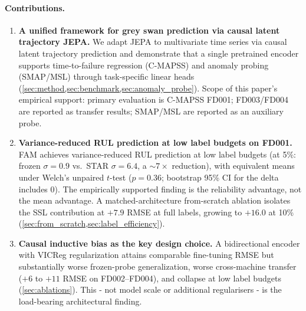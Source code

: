 \documentclass{article}
\begin{document}
\paragraph{Contributions.}
\begin{enumerate}[nosep]
  \item \textbf{A unified framework for grey swan prediction via causal latent trajectory JEPA.} We adapt JEPA to multivariate time series via causal latent trajectory prediction and demonstrate that a single pretrained encoder supports time-to-failure regression (C-MAPSS) and anomaly probing (SMAP/MSL) through task-specific linear heads (\cref{sec:method,sec:benchmark,sec:anomaly_probe}). Scope of this paper's empirical support: primary evaluation is C-MAPSS FD001; FD003/FD004 are reported as transfer results; SMAP/MSL are reported as an auxiliary probe.

  \item \textbf{Variance-reduced RUL prediction at low label budgets on FD001.} FAM achieves variance-reduced RUL prediction at low label budgets (at 5\%: frozen $\sigma = 0.9$ vs.\ STAR $\sigma = 6.4$, a $\sim 7\times$ reduction), with equivalent means under Welch's unpaired $t$-test ($p = 0.36$; bootstrap 95\% CI for the delta includes $0$). The empirically supported finding is the reliability advantage, not the mean advantage. A matched-architecture from-scratch ablation isolates the SSL contribution at $+7.9$ RMSE at full labels, growing to $+16.0$ at 10\% (\cref{sec:from_scratch,sec:label_efficiency}).

  \item \textbf{Causal inductive bias as the key design choice.} A bidirectional encoder with VICReg regularization attains comparable fine-tuning RMSE but substantially worse frozen-probe generalization, worse cross-machine transfer ($+6$ to $+11$ RMSE on FD002--FD004), and collapse at low label budgets (\cref{sec:ablations}). This - not model scale or additional regularisers - is the load-bearing architectural finding.


\end{enumerate}
\end{document}
